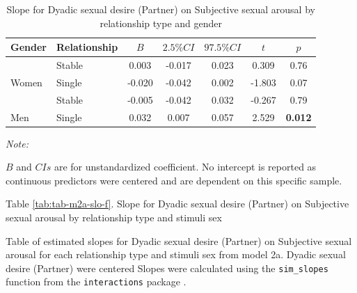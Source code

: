 \documentclass[
  bookmarksnumbered]{article}
\begin{document}
\begin{table}[H]

\caption{\label{tab:tab-m2a-slo-e}Slope for Dyadic sexual desire (Partner) on 
        Subjective sexual arousal by relationship type and gender}
\centering
\begin{threeparttable}
\begin{tabular}[t]{llccccc}
\toprule
Gender & Relationship & $B$ & $2.5\% CI$ & $97.5\% CI$ & $t$ & $p$\\
\midrule
 & Stable & 0.003 & -0.017 & 0.023 & 0.309 & 0.76\\
\cmidrule{2-7}
\multirow{-2}{*}{\raggedright\arraybackslash Women} & Single & -0.020 & -0.042 & 0.002 & -1.803 & 0.07\\
\cmidrule{1-7}
 & Stable & -0.005 & -0.042 & 0.032 & -0.267 & 0.79\\
\cmidrule{2-7}
\multirow{-2}{*}{\raggedright\arraybackslash Men} & Single & 0.032 & 0.007 & 0.057 & 2.529 & \textbf{0.012}\\
\bottomrule
\end{tabular}
\begin{tablenotes}[para]
\item \textit{Note: } 
\item $B$ and $CIs$ are for unstandardized coefficient.
           No intercept is reported as continuous predictors were centered
           and are dependent on this specific sample.
\end{tablenotes}
\end{threeparttable}
\end{table}

Table \ref{tab:tab-m2a-slo-f}. Slope for Dyadic sexual desire (Partner) on Subjective sexual arousal by relationship type and stimuli sex

Table of estimated slopes for Dyadic sexual desire (Partner) on Subjective sexual arousal for each relationship type and stimuli sex from model 2a. Dyadic sexual desire (Partner) were centered Slopes were calculated using the \texttt{sim\_slopes} function from the \texttt{interactions} package \autocite{interactionscit}.
\end{document}
